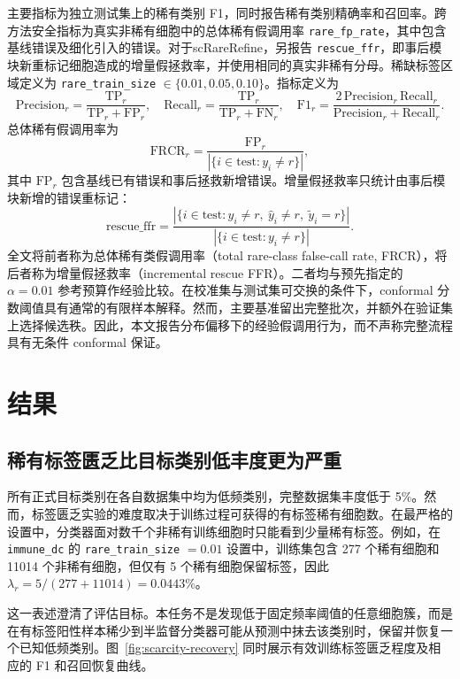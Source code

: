 \documentclass[pdflatex,sn-mathphys-num]{sn-jnl}
\theoremstyle{thmstyleone}%
\theoremstyle{thmstyletwo}%
\theoremstyle{thmstylethree}%
\newcommand{\method}{scRareRefine}
\newcommand{\rare}{r}
\newcommand{\rts}{\texttt{rare\_train\_size}}
\newcommand{\testsplit}{\mathrm{test}}
\begin{document}
主要指标为独立测试集上的稀有类别 F1，同时报告稀有类别精确率和召回率。跨方法安全指标为真实非稀有细胞中的总体稀有假调用率 \texttt{rare\_fp\_rate}，其中包含基线错误及细化引入的错误。对于\method，另报告 \texttt{rescue\_ffr}，即事后模块新重标记细胞造成的增量假拯救率，并使用相同的真实非稀有分母。稀缺标签区域定义为 \rts{} $\in\{0.01,0.05,0.10\}$。指标定义为
\[
\mathrm{Precision}_\rare=\frac{\mathrm{TP}_\rare}{\mathrm{TP}_\rare+\mathrm{FP}_\rare},\quad
\mathrm{Recall}_\rare=\frac{\mathrm{TP}_\rare}{\mathrm{TP}_\rare+\mathrm{FN}_\rare},\quad
\mathrm{F1}_\rare=\frac{2\,\mathrm{Precision}_\rare\,\mathrm{Recall}_\rare}{\mathrm{Precision}_\rare+\mathrm{Recall}_\rare}.
\]
总体稀有假调用率为
\[
\mathrm{FRCR}_\rare=\frac{\mathrm{FP}_\rare}{|\{i\in\testsplit:y_i\ne\rare\}|},
\]
其中 $\mathrm{FP}_\rare$ 包含基线已有错误和事后拯救新增错误。增量假拯救率只统计由事后模块新增的错误重标记：
\[
\mathrm{rescue\_ffr}=
\frac{|\{i\in\testsplit:y_i\ne\rare,\ \hat y_i\ne\rare,\ \tilde y_i=\rare\}|}
{|\{i\in\testsplit:y_i\ne\rare\}|}.
\]
全文将前者称为总体稀有类假调用率（total rare-class false-call rate, FRCR），将后者称为增量假拯救率（incremental rescue FFR）。二者均与预先指定的 $\alpha=0.01$ 参考预算作经验比较。在校准集与测试集可交换的条件下，conformal 分数阈值具有通常的有限样本解释。然而，主要基准留出完整批次，并额外在验证集上选择候选秩。因此，本文报告分布偏移下的经验假调用行为，而不声称完整流程具有无条件 conformal 保证。

\section{结果}

\subsection{稀有标签匮乏比目标类别低丰度更为严重}

所有正式目标类别在各自数据集中均为低频类别，完整数据集丰度低于 5\%。然而，标签匮乏实验的难度取决于训练过程可获得的有标签稀有细胞数。在最严格的设置中，分类器面对数千个非稀有训练细胞时只能看到少量稀有标签。例如，在 \texttt{immune\_dc} 的 \rts{} $=0.01$ 设置中，训练集包含 277 个稀有细胞和 11014 个非稀有细胞，但仅有 5 个稀有细胞保留标签，因此 $\lambda_\rare=5/(277+11014)=0.0443\%$。

这一表述澄清了评估目标。本任务不是发现低于固定频率阈值的任意细胞簇，而是在有标签阳性样本稀少到半监督分类器可能从预测中抹去该类别时，保留并恢复一个已知低频类别。图~\ref{fig:scarcity-recovery} 同时展示有效训练标签匮乏程度及相应的 F1 和召回恢复曲线。
\end{document}
